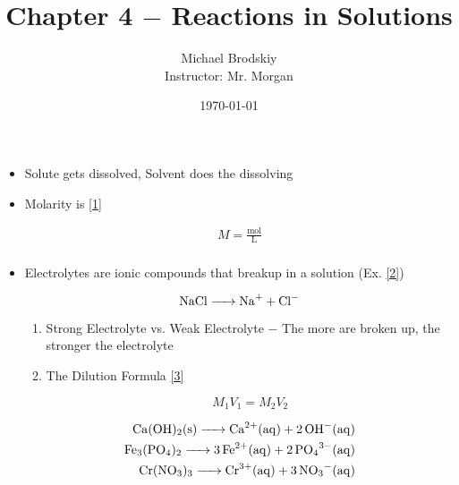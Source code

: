 \documentclass[12pt]{article}
\title{Chapter 4 $-$ Reactions in Solutions}
\date{\today}
\author{Michael Brodskiy\\ \small Instructor: Mr. Morgan}
\begin{document}
\maketitle

\begin{itemize}

  \item Solute gets dissolved, Solvent does the dissolving

  \item Molarity is \eqref{1}

    \begin{equation}
      \begin{split}
        M=\frac{\si{\mole}}{\si{\liter}}\\
      \end{split}
      \label{1}
    \end{equation}

  \item Electrolytes are ionic compounds that breakup in a solution (Ex. \eqref{2})

    \begin{equation}
      \ce{NaCl -> Na+ + Cl-}
      \label{2}
    \end{equation}

    \begin{enumerate}

      \item Strong Electrolyte vs. Weak Electrolyte $-$ The more are broken up, the stronger the electrolyte

      \item The Dilution Formula \eqref{3}

        \begin{equation}
          M_1V_1=M_2V_2
          \label{3}
        \end{equation}

    \end{enumerate}

    \begin{equation}
      \begin{split}
        \ce{Ca(OH)2(s) -> Ca^2+(aq) + 2OH-(aq)}\\
        \ce{Fe3(PO4)2 -> 3Fe^2+(aq) + 2PO4^3-(aq)}\\
        \ce{Cr(NO3)3 -> Cr^3+(aq) + 3NO3^-(aq)}\\
      \end{split}
      \label{4}
    \end{equation}


\end{itemize}
\end{document}
